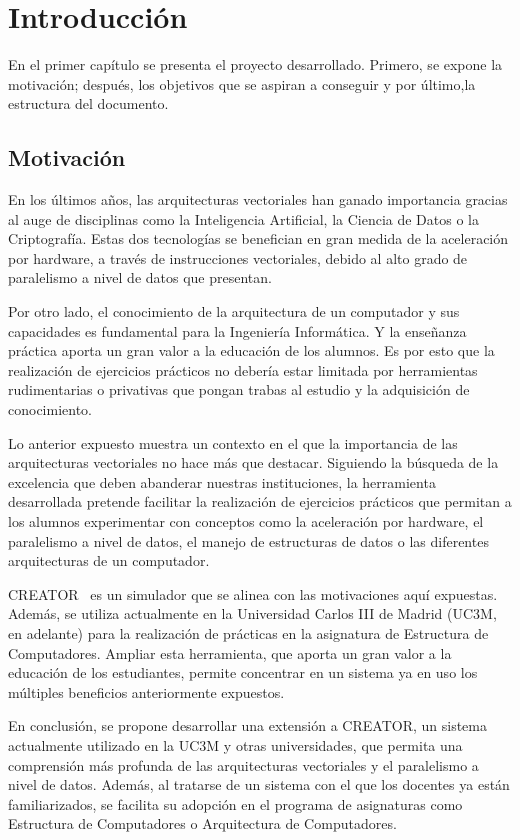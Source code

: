 \chapter{Introducción}\label{chap:introduction}
En el primer capítulo se presenta el proyecto desarrollado. Primero, se expone la motivación; después, los objetivos que se aspiran a conseguir y por último,la estructura del documento.

\section{Motivación}\label{sec:motivation}

En los últimos años, las arquitecturas vectoriales han ganado importancia gracias al auge de disciplinas como la Inteligencia Artificial, la Ciencia de Datos o la Criptografía. Estas dos tecnologías se benefician en gran medida de la aceleración por hardware, a través de instrucciones vectoriales, debido al alto grado de paralelismo a nivel de datos que presentan.

Por otro lado, el conocimiento de la arquitectura de un computador y sus capacidades es fundamental para la Ingeniería Informática. Y la enseñanza práctica aporta un gran valor a la educación de los alumnos. Es por esto que la realización de ejercicios prácticos no debería estar limitada por herramientas rudimentarias o privativas que pongan trabas al estudio y la adquisición de conocimiento. 

Lo anterior expuesto muestra un contexto en el que la importancia de las arquitecturas vectoriales no hace más que destacar. Siguiendo la búsqueda de la excelencia que deben abanderar nuestras instituciones, la herramienta desarrollada pretende facilitar la realización de ejercicios prácticos que permitan a los alumnos experimentar con conceptos como la aceleración por hardware, el paralelismo a nivel de datos, el manejo de estructuras de datos o las diferentes arquitecturas de un computador.

CREATOR~\cite{camarmas2024creator} es un simulador que se alinea con las motivaciones aquí expuestas. Además, se utiliza actualmente en la Universidad Carlos III de Madrid (UC3M, en adelante) para la realización de prácticas en la asignatura de Estructura de Computadores. Ampliar esta herramienta, que aporta un gran valor a la educación de los estudiantes, permite concentrar en un sistema ya en uso los múltiples beneficios anteriormente expuestos.

En conclusión, se propone desarrollar una extensión a CREATOR, un sistema actualmente utilizado en la UC3M y otras universidades, que permita una comprensión más profunda de las arquitecturas vectoriales y el paralelismo a nivel de datos. Además, al tratarse de un sistema con el que los docentes ya están familiarizados, se facilita su adopción en el programa de asignaturas como Estructura de Computadores o Arquitectura de Computadores.

